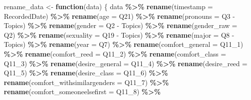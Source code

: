 \documentclass[12pt,twoside]{reedthesis}
\newenvironment{Shaded}{\begin{snugshade}}{\end{snugshade}}
\newcommand{\ControlFlowTok}[1]{\textcolor[rgb]{0.13,0.29,0.53}{\textbf{#1}}}
\newcommand{\DataTypeTok}[1]{\textcolor[rgb]{0.13,0.29,0.53}{#1}}
\newcommand{\DecValTok}[1]{\textcolor[rgb]{0.00,0.00,0.81}{#1}}
\newcommand{\KeywordTok}[1]{\textcolor[rgb]{0.13,0.29,0.53}{\textbf{#1}}}
\newcommand{\NormalTok}[1]{#1}
\newcommand{\OperatorTok}[1]{\textcolor[rgb]{0.81,0.36,0.00}{\textbf{#1}}}
\newcommand{\StringTok}[1]{\textcolor[rgb]{0.31,0.60,0.02}{#1}}
\begin{document}
\begin{Shaded}
\begin{Highlighting}[]
\NormalTok{rename\_data \textless{}{-}}\StringTok{ }\ControlFlowTok{function}\NormalTok{(data) \{}
\NormalTok{  data }\OperatorTok{\%\textgreater{}\%}
\StringTok{    }\KeywordTok{rename}\NormalTok{(}\DataTypeTok{timestamp =}\NormalTok{ RecordedDate) }\OperatorTok{\%\textgreater{}\%}
\StringTok{    }\KeywordTok{rename}\NormalTok{(}\DataTypeTok{age =}\NormalTok{ Q21) }\OperatorTok{\%\textgreater{}\%}
\StringTok{    }\KeywordTok{rename}\NormalTok{(}\DataTypeTok{pronouns =} \StringTok{\textasciigrave{}}\DataTypeTok{Q3 {-} Topics}\StringTok{\textasciigrave{}}\NormalTok{) }\OperatorTok{\%\textgreater{}\%}
\StringTok{    }\KeywordTok{rename}\NormalTok{(}\DataTypeTok{gender =} \StringTok{\textasciigrave{}}\DataTypeTok{Q2 {-} Topics}\StringTok{\textasciigrave{}}\NormalTok{) }\OperatorTok{\%\textgreater{}\%}
\StringTok{    }\KeywordTok{rename}\NormalTok{(}\DataTypeTok{gender\_raw =}\NormalTok{ Q2) }\OperatorTok{\%\textgreater{}\%}
\StringTok{    }\KeywordTok{rename}\NormalTok{(}\DataTypeTok{sexuality =} \StringTok{\textasciigrave{}}\DataTypeTok{Q19 {-} Topics}\StringTok{\textasciigrave{}}\NormalTok{) }\OperatorTok{\%\textgreater{}\%}
\StringTok{    }\KeywordTok{rename}\NormalTok{(}\DataTypeTok{major =} \StringTok{\textasciigrave{}}\DataTypeTok{Q8 {-} Topics}\StringTok{\textasciigrave{}}\NormalTok{) }\OperatorTok{\%\textgreater{}\%}
\StringTok{    }\KeywordTok{rename}\NormalTok{(}\DataTypeTok{year =}\NormalTok{ Q7) }\OperatorTok{\%\textgreater{}\%}
\StringTok{    }\KeywordTok{rename}\NormalTok{(}\DataTypeTok{comfort\_general =}\NormalTok{ Q11\_}\DecValTok{1}\NormalTok{) }\OperatorTok{\%\textgreater{}\%}
\StringTok{    }\KeywordTok{rename}\NormalTok{(}\DataTypeTok{comfort\_reed =}\NormalTok{ Q11\_}\DecValTok{2}\NormalTok{) }\OperatorTok{\%\textgreater{}\%}
\StringTok{    }\KeywordTok{rename}\NormalTok{(}\DataTypeTok{comfort\_class =}\NormalTok{ Q11\_}\DecValTok{3}\NormalTok{) }\OperatorTok{\%\textgreater{}\%}
\StringTok{    }\KeywordTok{rename}\NormalTok{(}\DataTypeTok{desire\_general =}\NormalTok{ Q11\_}\DecValTok{4}\NormalTok{) }\OperatorTok{\%\textgreater{}\%}
\StringTok{    }\KeywordTok{rename}\NormalTok{(}\DataTypeTok{desire\_reed =}\NormalTok{ Q11\_}\DecValTok{5}\NormalTok{) }\OperatorTok{\%\textgreater{}\%}
\StringTok{    }\KeywordTok{rename}\NormalTok{(}\DataTypeTok{desire\_class =}\NormalTok{ Q11\_}\DecValTok{6}\NormalTok{) }\OperatorTok{\%\textgreater{}\%}
\StringTok{    }\KeywordTok{rename}\NormalTok{(}\DataTypeTok{comfort\_withsimilargenders =}\NormalTok{ Q11\_}\DecValTok{7}\NormalTok{) }\OperatorTok{\%\textgreater{}\%}
\StringTok{    }\KeywordTok{rename}\NormalTok{(}\DataTypeTok{comfort\_someoneelsefirst =}\NormalTok{ Q11\_}\DecValTok{8}\NormalTok{) }\OperatorTok{\%\textgreater{}\%}

\end{Highlighting}
\end{Shaded}
\end{document}
